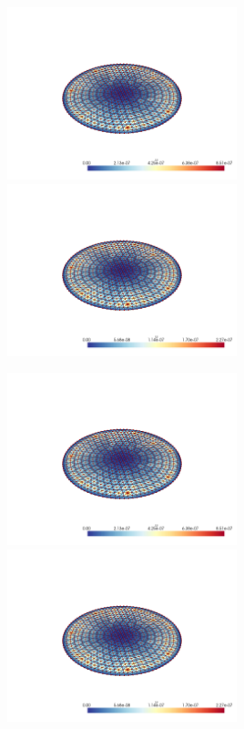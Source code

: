 \documentclass[
  11pt,
]{article}
\let\origfigure\figure
\let\endorigfigure\endfigure
\renewenvironment{figure}[1][2] {
    \expandafter\origfigure\expandafter[H]
} {
    \endorigfigure
}
\begin{document}
\begin{figure}
\caption{Finite element error in the L2 and H1 norms/seminorms, respectively for problem 1 over mesh number 3 using order 5 quadrature.}
\end{figure}

\includegraphics[width=0.5\textwidth,height=\textheight]{../img/mesh3-gauss08-b-L2.png}
\includegraphics[width=0.5\textwidth,height=\textheight]{../img/mesh3-gauss08-b-H1.png}

\begin{figure}
\caption{Finite element error in the L2 and H1 norms/seminorms, respectively for problem 1 over mesh number 3 using order 8 quadrature.}
\end{figure}

\includegraphics[width=0.5\textwidth,height=\textheight]{../img/mesh3-gauss13-b-L2.png}
\includegraphics[width=0.5\textwidth,height=\textheight]{../img/mesh3-gauss13-b-H1.png}
\end{document}
